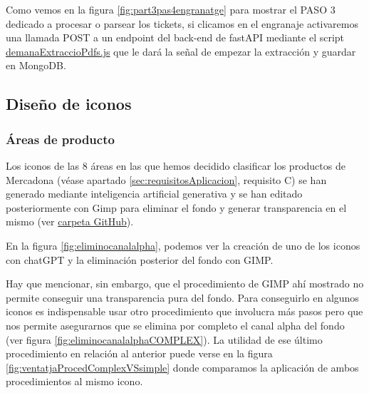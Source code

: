 \documentclass[a4paper,12pt]{report}
\begin{document}
	Como vemos en la figura \ref{fig:part3pas4engranatge} para mostrar el PASO 3 dedicado a procesar o parsear los tickets, si clicamos en el engranaje activaremos una llamada POST a un endpoint del back-end de fastAPI mediante el script \href{https://github.com/blackcub3s/mercApp/blob/main/APP%20WEB/__frontend__produccio__/app/js/pas4/demanaExtraccioPdfs.js}{demanaExtraccioPdfs.js} que le dará la señal de empezar la extracción y guardar en MongoDB.
	
	
	
	\subsection{Diseño de iconos}
	
	\subsubsection{Áreas de producto}
	
	Los iconos de las 8 áreas en las que hemos decidido clasificar los productos de Mercadona (véase apartado \ref{sec:requisitosAplicacion}, requisito C) se han generado mediante inteligencia artificial generativa y se han editado posteriormente con Gimp para eliminar el fondo y generar transparencia en el mismo (ver \href{https://github.com/blackcub3s/mercApp/tree/main/creacioIconos/categoriesProductes}{carpeta GitHub}).
	
	
	En la figura \ref{fig:eliminocanalalpha}, podemos ver la creación de uno de los iconos con chatGPT y la eliminación posterior del fondo con GIMP. 
	
	Hay que mencionar, sin embargo, que el procedimiento de GIMP ahí mostrado no permite conseguir una transparencia pura del fondo. Para conseguirlo en algunos iconos es indispensable usar otro procedimiento que involucra más pasos pero que nos permite asegurarnos que se elimina por completo el canal alpha del fondo (ver figura \ref{fig:eliminocanalalphaCOMPLEX}). La utilidad de ese último procedimiento en relación al anterior puede verse en la figura \ref{fig:ventatjaProcedComplexVSsimple} donde comparamos la aplicación de ambos procedimientos al mismo icono.


	
	
	
	
\end{document}
